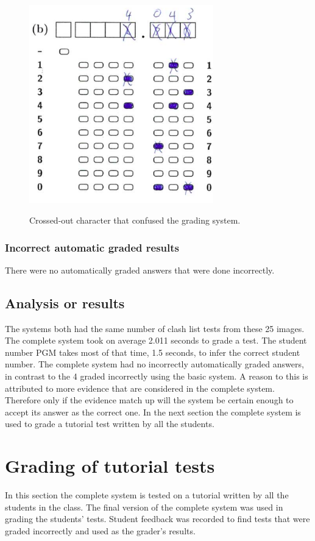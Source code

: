 \begin{figure}
  \centering
  \includegraphics[width=8cm]{crossedOutCharacter}\\
  \caption{Crossed-out character that confused the grading system.}
  \label{fig:crossedOutCharacter}
\end{figure}

\subsubsection{Incorrect automatic graded results}

There were no automatically graded answers that were done incorrectly.

\subsection{Analysis or results}

The systems both had the same number of clash list tests from these 25 images. The complete system took on average 2.011 seconds to grade a test. The student number PGM takes most of that time, 1.5 seconds, to infer the correct student number. The complete system had no incorrectly automatically graded answers, in contrast to the 4 graded incorrectly using the basic system. A reason to this is attributed to more evidence that are considered in the complete system. Therefore only if the evidence match up will the system be certain enough to accept its answer as the correct one. In the next section the complete system is used to grade a tutorial test written by all the students. 

\section{Grading of tutorial tests}
In this section the complete system is tested on a tutorial written by all the students in the class. The final version of the complete system was used in grading the students' tests. Student feedback was recorded to find tests that were graded incorrectly and used as the grader's results. 

